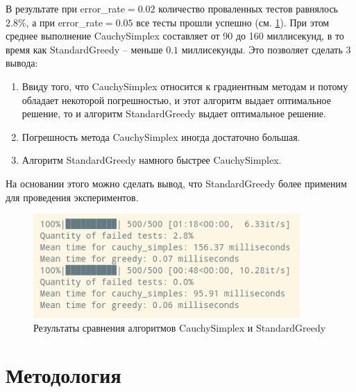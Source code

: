 \documentclass{article}
\begin{document}
В результате при error\_rate$=0.02$ количество проваленных тестов равнялось $2.8\%$, а при error\_rate$=0.05$ все тесты прошли успешно (см. \ref{fig:comparison_standard_greedy_cauchy_simplex}). При этом среднее выполнение CauchySimplex составляет от 90 до 160 миллисекунд, в то время как StandardGreedy -- меньше $0.1$ миллисекунды. Это позволяет сделать 3 вывода:
\begin{enumerate}
    \item Ввиду того, что CauchySimplex относится к градиентным методам и потому обладает некоторой погрешностью, и этот алгоритм выдает оптимальное решение, то и алгоритм StandardGreedy выдает оптимальное решение.
    \item Погрешность метода CauchySimplex иногда достаточно большая.
    \item Алгоритм StandardGreedy намного быстрее CauchySimplex.
\end{enumerate}
На основании этого можно сделать вывод, что StandardGreedy более применим для проведения экспериментов.

\begin{figure}[ht!] %
\centering
\includegraphics[width=4in]{theory_tester/theory_images/results_compare.png}
\caption{Результаты сравнения алгоритмов CauchySimplex и StandardGreedy}
\label{fig:comparison_standard_greedy_cauchy_simplex}
\end{figure}

\section{Методология}
\end{document}

